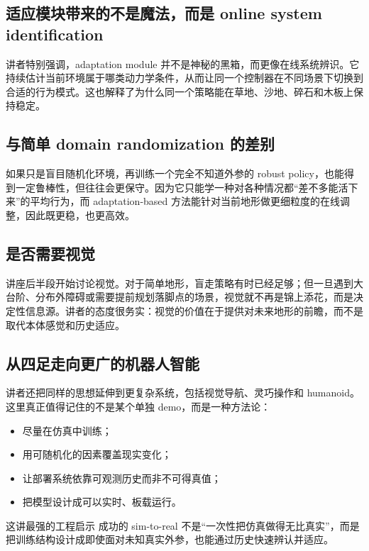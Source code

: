 \documentclass[a4paper]{article}
\begin{document}
\subsection{适应模块带来的不是魔法，而是 online system identification}

讲者特别强调，adaptation module 并不是神秘的黑箱，而更像在线系统辨识。它持续估计当前环境属于哪类动力学条件，从而让同一个控制器在不同场景下切换到合适的行为模式。这也解释了为什么同一个策略能在草地、沙地、碎石和木板上保持稳定。

\subsection{与简单 domain randomization 的差别}

如果只是盲目随机化环境，再训练一个完全不知道外参的 robust policy，也能得到一定鲁棒性，但往往会更保守。因为它只能学一种对各种情况都“差不多能活下来”的平均行为，而 adaptation-based 方法能针对当前地形做更细粒度的在线调整，因此既更稳，也更高效。

\subsection{是否需要视觉}

讲座后半段开始讨论视觉。对于简单地形，盲走策略有时已经足够；但一旦遇到大台阶、分布外障碍或需要提前规划落脚点的场景，视觉就不再是锦上添花，而是决定性信息源。讲者的态度很务实：视觉的价值在于提供对未来地形的前瞻，而不是取代本体感觉和历史适应。

\subsection{从四足走向更广的机器人智能}

讲者还把同样的思想延伸到更复杂系统，包括视觉导航、灵巧操作和 humanoid。这里真正值得记住的不是某个单独 demo，而是一种方法论：
\begin{itemize}
\item 尽量在仿真中训练；
\item 用可随机化的因素覆盖现实变化；
\item 让部署系统依靠可观测历史而非不可得真值；
\item 把模型设计成可以实时、板载运行。
\end{itemize}

\begin{importantbox}{这讲最强的工程启示}
成功的 sim-to-real 不是“一次性把仿真做得无比真实”，而是把训练结构设计成即使面对未知真实外参，也能通过历史快速辨认并适应。
\end{importantbox}
\end{document}
